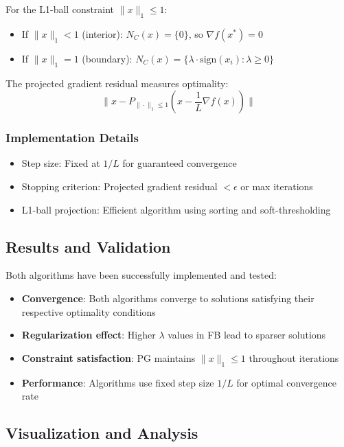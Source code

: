 \documentclass[11pt,a4paper]{article}
\begin{document}
For the L1-ball constraint $\|x\|_1 \leq 1$:
\begin{itemize}
    \item If $\|x\|_1 < 1$ (interior): $N_C(x) = \{0\}$, so $\nabla f(x^*) = 0$
    \item If $\|x\|_1 = 1$ (boundary): $N_C(x) = \{\lambda \cdot \text{sign}(x_i) : \lambda \geq 0\}$
\end{itemize}

The projected gradient residual measures optimality:
\[ \|x - P_{\|\cdot\|_1 \leq 1}(x - \frac{1}{L}\nabla f(x))\| \]

\subsubsection{Implementation Details}

\begin{itemize}
    \item Step size: Fixed at $1/L$ for guaranteed convergence
    \item Stopping criterion: Projected gradient residual $< \epsilon$ or max iterations
    \item L1-ball projection: Efficient algorithm using sorting and soft-thresholding
\end{itemize}

\subsection{Results and Validation}

Both algorithms have been successfully implemented and tested:
\begin{itemize}
    \item \textbf{Convergence}: Both algorithms converge to solutions satisfying their respective optimality conditions
    \item \textbf{Regularization effect}: Higher $\lambda$ values in FB lead to sparser solutions
    \item \textbf{Constraint satisfaction}: PG maintains $\|x\|_1 \leq 1$ throughout iterations
    \item \textbf{Performance}: Algorithms use fixed step size $1/L$ for optimal convergence rate
\end{itemize}

\subsection{Visualization and Analysis}
\end{document}
